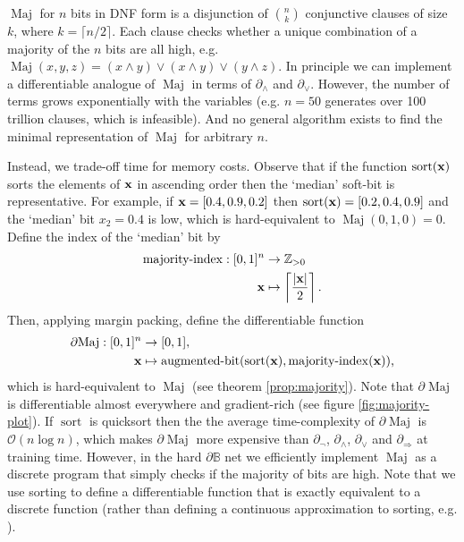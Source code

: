 \documentclass{article} %
\begin{document}
$\operatorname{Maj}$ for $n$ bits in DNF form is a disjunction of $\binom{n}{k}$ conjunctive clauses of size $k$, where $k=\lceil n/2 \rceil$. Each clause checks whether a unique combination of a majority of the $n$ bits are all high, e.g. $\operatorname{Maj}(x, y, z) = (x \wedge y) \vee (x \wedge y) \vee (y \wedge z)$. In principle we can implement a differentiable analogue of $\operatorname{Maj}$ in terms of $\partial_{\wedge}$ and $\partial_{\vee}$. However, the number of terms grows exponentially with the variables (e.g. $n=50$ generates over 100 trillion clauses, which is infeasible). And no general algorithm exists to find the minimal representation of $\operatorname{Maj}$ for arbitrary $n$.

Instead, we trade-off time for memory costs. Observe that if the function $\operatorname{sort}({\bf x})$ sorts the elements of ${\bf x}$ in ascending order then the `median' soft-bit is representative. For example, if ${\bf x} = [0.4, 0.9, 0.2]$ then $\operatorname{sort}({\bf x}) = [0.2, 0.4, 0.9]$ and the `median' bit $x_{2}=0.4$ is low, which is hard-equivalent to $\operatorname{Maj}(0, 1, 0) = 0$. Define the index of the `median' bit by
\begin{equation*}
\begin{aligned}
\operatorname{majority-index}: [0, 1]^{n} & \to \mathbb{Z}_{> 0}\\
{\bf x} & \mapsto \left\lceil \frac{|{\bf x}|}{2} \right\rceil
\text{.}
\end{aligned}
\end{equation*}
Then, applying margin packing, define the differentiable function
\begin{equation*}
\begin{aligned}
	\partial\!\operatorname{Maj}: [0,1]^{n} &\to [0,1], \\
	{\bf x} &\mapsto \operatorname{augmented-bit}(\operatorname{sort}({\bf x}), \operatorname{majority-index}({\bf x}))\text{,}
\end{aligned}
\end{equation*}
which is hard-equivalent to $\operatorname{Maj}$ (see theorem \ref{prop:majority}). Note that $\partial\!\operatorname{Maj}$ is differentiable almost everywhere and gradient-rich (see figure \ref{fig:majority-plot}). If $\operatorname{sort}$ is quicksort then the the average time-complexity of $\partial\!\operatorname{Maj}$ is $\mathcal{O}(n\log{}n)$, which makes $\partial\!\operatorname{Maj}$ more expensive than $\partial_{\neg}$, $\partial_{\wedge}$, $\partial_{\vee}$ and $\partial_{\Rightarrow}$ at training time. However, in the hard $\partial\mathbb{B}$ net we efficiently implement $\operatorname{Maj}$ as a discrete program that simply checks if the majority of bits are high. Note that we use sorting to define a differentiable function that is exactly equivalent to a discrete function (rather than defining a continuous approximation to sorting, e.g. \cite{NEURIPS2019_d8c24ca8}).
\end{document}

